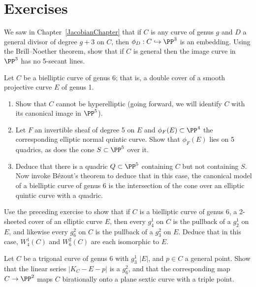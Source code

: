 {\section{Exercises}

\begin{exercise}
\label{out of place}
We saw in Chapter~\ref{JacobianChapter} that if $C$ is any curve of genus
$g$ and $D$ a general divisor of degree $g+3$ on $C$, then $\phi_D :
C \hookrightarrow \PP^3$ is an embedding. Using the Brill--Noether
theorem, show that if $C$ is general then the image curve in $\PP^3$
has no 5-secant lines.
\end{exercise}

\begin{exercise}
Let $C$ be a bielliptic curve of genus 6; that is, a double cover of a
%
smooth projective curve $E$ of genus 1.
\begin{enumerate}
\item Show that $C$ cannot be hyperelliptic (going forward, we will
identify $C$ with its canonical image in $\PP^5$).
\item Let $F$ an invertible sheaf of degree 5 on $E$ and $\phi_F(E)
\subset \PP^4$ the corresponding elliptic normal quintic curve. Show that
$\phi_F(E)$ lies on 5 quadrics, as does the cone $S \subset \PP^5$ over it.
\item Deduce that there is a quadric $Q \subset \PP^5$ containing $C$
but not containing $S$. Now invoke B\'ezout's theorem to deduce that in
this case, the canonical model of a bielliptic curve of genus 6 is the
intersection of the cone over an elliptic quintic curve with a quadric.
\end{enumerate}
\end{exercise}

\begin{exercise}
Use the preceding exercise to show that if $C$ is a bielliptic curve of
genus 6, a 2-sheeted cover of an elliptic curve $E$, then every $g^1_4$
on $C$ is the pullback of a $g^1_2$ on $E$, and likewise  every $g^2_6$
on $C$ is the pullback of a $g^2_3$ on $E$. Deduce that in this case,
$W^1_4(C)$ and $W^2_6(C)$ are each isomorphic to $E$.
\end{exercise}

\begin{exercise}
Let $C$ be a trigonal curve of genus 6 with $g^1_3$ $|E|$, and $p \in C$
a general point. Show that the linear series $|K_C - E-p|$ is a $g^2_6$,
and that the corresponding map $C \to \PP^2$ maps $C$ birationally onto
a plane sextic curve with a triple point.
\end{exercise}

}
